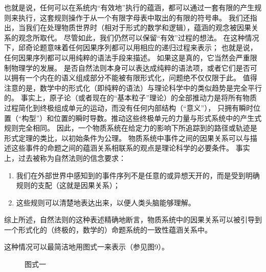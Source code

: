 \documentclass[a4paper,12pt]{article}
\begin{document}
也就是说，任何可以在系统内“有效地”执行的蕴涵，都可以通过一套有限的产生规则来执行，这套规则操作于从一个有限字母表中取出的有限的符号串。
我们还指出，当我们在处理物质世界时（相对于形式的数学和逻辑），蕴涵的观念被因果关系的观念所取代。
尽管如此，我们仍然可以保留“有效”过程的想法。 在这种情况下，邱奇论题意味着任何因果序列都可以用相应的递归过程来表示；
也就是说，任何因果序列都可以用纯粹的语法手段来描述。 如果这是真的，它当然会严重限制物理学的发展。
是否自然法则本身可以表达成纯粹的语法项，或者它们是否可以拥有一个内在的语义组成部分不能被有限形式化，问题绝不仅仅限于此。
值得注意的是，数学中的形式化（即纯粹的语法）与理论科学中的类似趋势是完全平行的。
事实上，原子论（或者现在的“基本粒子”理论）的全部推动力是将所有物质过程简化到终极组成单元的运动，而没有任何内部结构（“意义”），
只拥有瞬时位置（“构型”）和位置的瞬时导数。推动这些终极单元的力量与形式系统中的产生式规则完全相同。
因此，一个物质系统在给定力的影响下所追踪到的路径或轨迹是形式定理的类比，以初始条件为公理。
物质系统中事件之间的因果关系可以与描述这些事件的命题之间的蕴涵关系相联系的观点是理论科学的必要条件。
事实上，过去被称为自然法则的信念要求：
\begin{enumerate}[label=(\alph*)]
\item 我们在外部世界中感知到的事件序列不是任意的或异想天开的，而是受到明确规则的支配（这就是因果关系）；
\item 这些规则可以清楚地表达出来，以便人类头脑能够理解。
\end{enumerate}
综上所述，自然法则的这种表述精确地断言，物质系统中的因果关系可以被引导到一个形式化的（终极的，数学的）命题系统的一致性蕴涵关系中。

这种情况可以最简洁地用图式一来表示（参见图9）。

\begin{figure}[ht]
\centering
{}
\caption{图式一}
\end{figure}
\end{document}
